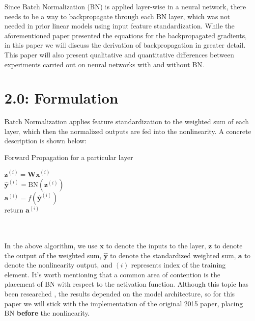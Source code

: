 \documentclass{article}
\begin{document}
\begin{multicols*}{2}
Since Batch Normalization (BN) is applied layer-wise in a neural network, 
there needs to be a way to backpropagate through each BN layer, which 
was not needed in prior linear models using input feature standardization.
While the aforementioned paper presented the equations for the backpropagated
gradients, in this paper we will discuss the derivation of backpropagation
in greater detail. This paper will also present qualitative and quantitative
differences between experiments carried out on neural networks with 
and without BN.








\section*{2.0: Formulation}

Batch Normalization applies feature standardization to the weighted sum of 
each layer, which then the normalized outputs are fed into the nonlinearity.
A concrete description is shown below:\\



\renewcommand{\thealgocf}{2.0.0}


\begin{minipage}{0.8\linewidth}
\begin{algorithm}[H]
    \SetAlgoLined
    \caption{Forward Propagation for a particular layer}


    \vspace{10pt}
     {
    $\textbf{z}^{(i)} = \textbf{W}\textbf{x}^{(i)}$\\
    $\hat{\textbf{y}}^{(i)} = \text{BN}(\textbf{z}^{(i)})$\\
    $\textbf{a}^{(i)} = f(\hat{\textbf{y}}^{(i)})$ \\
    return $\textbf{a}^{(i)}$
    }
    \end{algorithm}
\end{minipage}\\\\


In the above algorithm, we use $\textbf{x}$ to denote the inputs to the layer, 
$\textbf{z}$ to denote the output of the weighted sum, 
$\hat{\textbf{y}}$ to denote the standardized weighted sum,
$\textbf{a}$ to denote the nonlinearity output, and $(i)$ represents index 
of the training element.
It's worth mentioning that a common area of contention is the placement 
of BN with respect to the activation function. Although this topic 
has been researched \cite{bnplacement}, the results depended on the model architecture, 
so for this paper we will stick with the implementation of the 
original 2015 paper\cite{batchnorm}, placing BN \textbf{before} the nonlinearity.


\end{multicols*}
\end{document}
